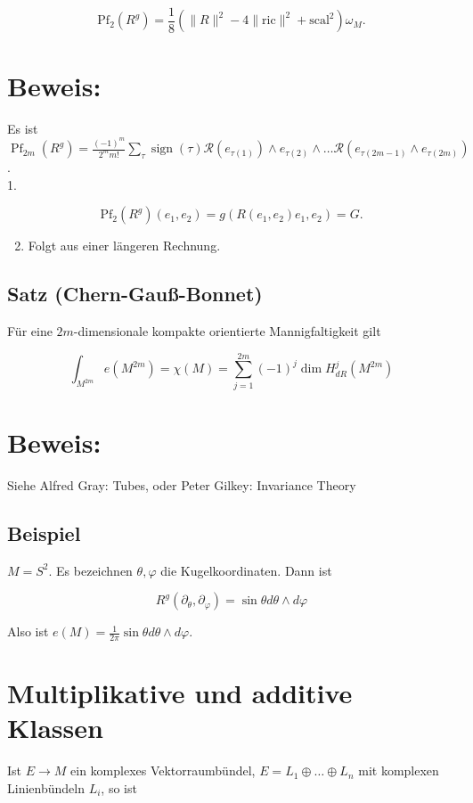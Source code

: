 \documentclass[10pt, letterpaper]{article}
\begin{document}
$$
\mathrm{Pf}_{2}\left(R^{g}\right)=\frac{1}{8}\left(\|R\|^{2}-4\|\mathrm{ric}\|^{2}+\mathrm{scal}^{2}\right) \omega_{M} .
$$

\section*{Beweis:}
Es ist $\operatorname{Pf}_{2 m}\left(R^{g}\right)=\frac{(-1)^{m}}{2^{m} m!} \sum_{\tau} \operatorname{sign}(\tau) \mathcal{R}\left(e_{\tau(1)}\right) \wedge e_{\tau(2)} \wedge \ldots \mathcal{R}\left(e_{\tau(2 m-1)} \wedge e_{\tau(2 m)}\right)$.\\
1.

$$
\mathrm{Pf}_{2}\left(R^{g}\right)\left(e_{1}, e_{2}\right)=g\left(R\left(e_{1}, e_{2}\right) e_{1}, e_{2}\right)=G .
$$

\begin{enumerate}
  \setcounter{enumi}{1}
  \item Folgt aus einer längeren Rechnung.
\end{enumerate}

\subsection*{Satz (Chern-Gauß-Bonnet)}
Für eine $2 m$-dimensionale kompakte orientierte Mannigfaltigkeit gilt

$$
\int_{M^{2 m}} e\left(M^{2 m}\right)=\chi(M)=\sum_{j=1}^{2 m}(-1)^{j} \operatorname{dim} H_{d R}^{j}\left(M^{2 m}\right)
$$

\section*{Beweis:}
Siehe Alfred Gray: Tubes, oder Peter Gilkey: Invariance Theory

\subsection*{Beispiel}
$M=S^{2}$. Es bezeichnen $\theta, \varphi$ die Kugelkoordinaten. Dann ist

$$
R^{g}\left(\partial_{\theta}, \partial_{\varphi}\right)=\sin \theta d \theta \wedge d \varphi
$$

Also ist $e(M)=\frac{1}{2 \pi} \sin \theta d \theta \wedge d \varphi$.

\section*{Multiplikative und additive Klassen}
Ist $E \rightarrow M$ ein komplexes Vektorraumbündel, $E=L_{1} \oplus \ldots \oplus L_{n}$ mit komplexen Linienbündeln $L_{i}$, so ist
\end{document}
